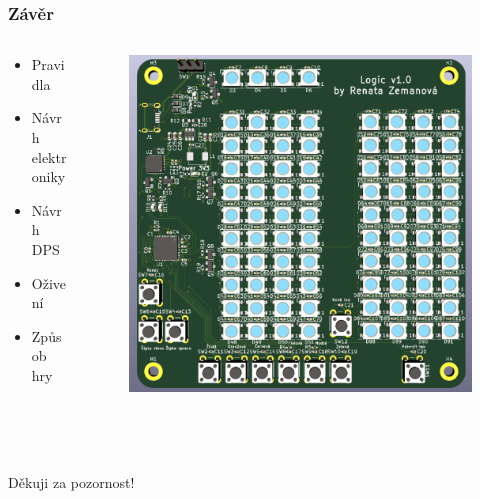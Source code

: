 \documentclass[%
  12pt,       				%
	t,                  %
	aspectratio=1610,   %
	unicode,						%
]{beamer}				    	%
\begin{document}
\begin{frame} 
	\frametitle{Závěr}
	\begin{columns}[T] %
		\begin{column}{0.3\textwidth}		%
			\vspace{0.5cm}
			\begin{itemize}
				\item Pravidla
				\item Návrh elektroniky
				\item Návrh DPS
				\item Oživení
				\item Způsob hry
			\end{itemize}
		\end{column}
		\begin{column}{0.7\textwidth}		%
			\begin{figure}%
				\centering
				\includegraphics[width=0.7\columnwidth]{obrazky/Verze1_3D_pohled.png}
			\end{figure}
		\end{column}
	\end{columns}	
\end{frame}


\begin{frame}[c] 
	\frametitle{\mbox{ }}
	\begin{center}
		{\Huge Děkuji za pozornost!}
	\end{center}
\end{frame}

\end{document}
